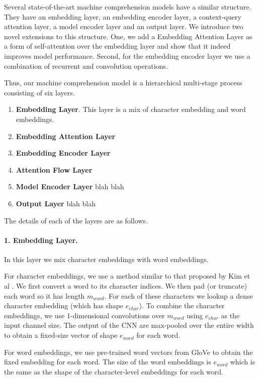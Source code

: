 Several state-of-the-art machine comprehension models have a similar structure. They have an embedding layer, an embedding encoder layer, a context-query attention layer, a model encoder layer and an output layer. We introduce two novel extensions to this structure.  One, we add a Embedding Attention Layer as a form of self-attention over the embedding layer and show that it indeed improves model performance. Second, for the embedding encoder layer we use a combination of recurrent and convolution operations. 

Thus, our machine comprehension model is a hierarchical multi-stage process consisting of six layers. 

\begin{enumerate}
\item \textbf{Embedding Layer}. This layer is a mix of character embedding and word embeddings. 
\item \textbf{Embedding Attention Layer}
\item \textbf{Embedding Encoder Layer}
\item \textbf{Attention Flow Layer}
\item \textbf{Model Encoder Layer} blah blah
\item \textbf{Output Layer} blah blah
\end{enumerate}

The details of each of the layers are as follows.

\paragraph{1. Embedding Layer.} In this layer we mix character embeddings with word embeddings. 

For character embeddings, we use a method similar to that proposed by Kim et al \cite{kim2016character}. We first convert a word to its character indices. We then pad (or truncate) each word so it has length $m_{word}$.  For each of these characters we lookup a dense character embedding (which has shape ${e_{char}}$). To combine the character embeddings, we use 1-dimensional convolutions over $m_{word}$ using ${e_{char}}$ as the input channel size. The output of the CNN are max-pooled over the entire width to obtain a fixed-size vector of shape ${e_{word}}$ for each word. 

For word embeddings, we use pre-trained word vectors from GloVe \cite{} to obtain the fixed embedding for each word. The size of the word embeddings is ${e_{word}}$ which is the same as the shape of the character-level embeddings for each word.  


